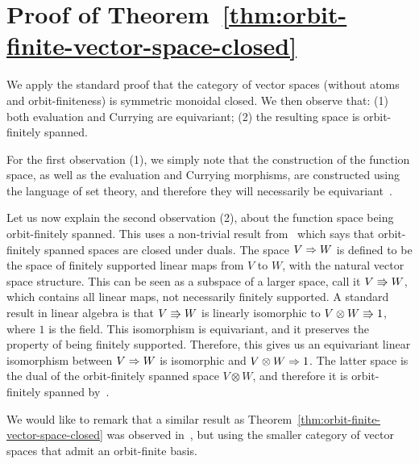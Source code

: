 \section{Proof of Theorem~\ref{thm:orbit-finite-vector-space-closed}}
 We apply the standard proof that the category of vector spaces (without atoms and orbit-finiteness) is symmetric monoidal closed. We then observe that: (1) both evaluation and Currying are equivariant; (2) the resulting space is orbit-finitely spanned. 
    
    For the first observation (1), we simply note that the construction of the function space, as well as  the evaluation and Currying morphisms, are constructed using the language of set theory, and therefore they will necessarily be equivariant~\cite[Equivariance Principle]{bojanczyk_slightly2018}.

    Let us now explain the second observation (2), about the function space being orbit-finitely spanned. This uses a non-trivial result from~\cite{bojanczykKM21OrbitFiniteVector} which says that orbit-finitely spanned spaces are closed under duals. 
    The space $V \Rightarrow W$ is defined to be the space of finitely supported linear maps from $V$ to $W$, with the natural vector space structure. This can be seen as a subspace of a larger space, call it $V \Rrightarrow W$, which contains all linear maps, not necessarily finitely supported. A standard result in linear algebra is that $V \Rrightarrow W$ is linearly isomorphic to $ V \otimes W \Rrightarrow 1$, where $1$ is the field. This isomorphism is equivariant, and it preserves the property of being finitely supported. Therefore, this gives us an equivariant linear isomorphism between $V \Rightarrow W$ is isomorphic and $ V \otimes W \Rightarrow 1$. The latter space is the dual of the orbit-finitely spanned space $V \otimes W$, and therefore it is orbit-finitely spanned by~\cite[Corollary VI.5]{bojanczykKM21OrbitFiniteVector}.


    We would like to remark that a similar result as Theorem~\ref{thm:orbit-finite-vector-space-closed} was observed in~\cite[Theorem 3.8]{przybyłek2024note}, but using the smaller category of vector spaces that admit an orbit-finite basis. 